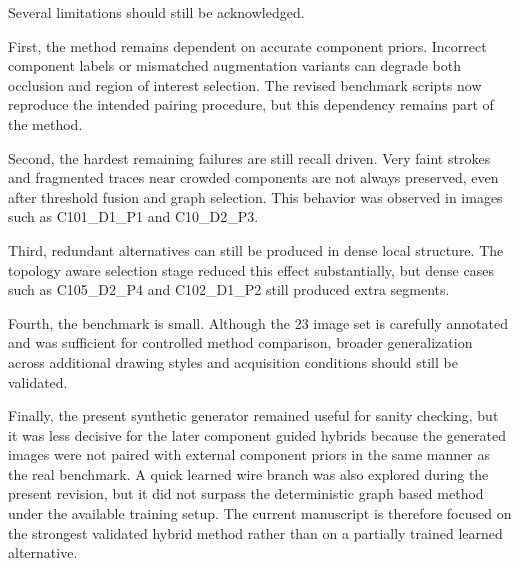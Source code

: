 Several limitations should still be acknowledged.

First, the method remains dependent on accurate component priors. Incorrect component labels or mismatched augmentation variants can degrade both occlusion and region of interest selection. The revised benchmark scripts now reproduce the intended pairing procedure, but this dependency remains part of the method.

Second, the hardest remaining failures are still recall driven. Very faint strokes and fragmented traces near crowded components are not always preserved, even after threshold fusion and graph selection. This behavior was observed in images such as C101\_D1\_P1 and C10\_D2\_P3.

Third, redundant alternatives can still be produced in dense local structure. The topology aware selection stage reduced this effect substantially, but dense cases such as C105\_D2\_P4 and C102\_D1\_P2 still produced extra segments.

Fourth, the benchmark is small. Although the 23 image set is carefully annotated and was sufficient for controlled method comparison, broader generalization across additional drawing styles and acquisition conditions should still be validated.

Finally, the present synthetic generator remained useful for sanity checking, but it was less decisive for the later component guided hybrids because the generated images were not paired with external component priors in the same manner as the real benchmark. A quick learned wire branch was also explored during the present revision, but it did not surpass the deterministic graph based method under the available training setup. The current manuscript is therefore focused on the strongest validated hybrid method rather than on a partially trained learned alternative.
